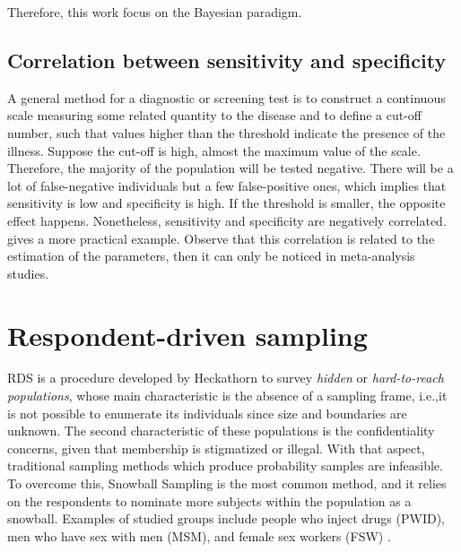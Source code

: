 Therefore, this work focus on the Bayesian paradigm. 

\subsection{Correlation between sensitivity and specificity}
\label{sec:correlation-sensitivity-specificity}

A general method for a diagnostic or screening test is to construct a
continuous scale measuring some related quantity to the disease and to define
a cut-off number, such that values higher than the threshold indicate the
presence of the illness. Suppose the cut-off is high, almost the maximum value
of the scale. Therefore, the majority of the population will be tested
negative. There will be a lot of false-negative individuals but a few
false-positive ones, which implies that sensitivity is low and specificity is
high. If the threshold is smaller, the opposite effect happens. Nonetheless,
sensitivity and specificity are negatively correlated. \textcite[p.
46]{parikh2008understanding} gives a more practical example. Observe that this
correlation is related to the estimation of the parameters, then it can only
be noticed in meta-analysis studies. 

\section{Respondent-driven sampling}
\label{sec:respodent_driven_sampling}

RDS is a procedure developed by Heckathorn
\cite[]{heckathorn1997} to survey {\em hidden} or {\em hard-to-reach
populations}, whose main characteristic is the absence of a sampling frame,
i.e.,it is not possible to enumerate its individuals since size and boundaries
are unknown. The second characteristic of these populations is the
confidentiality concerns, given that membership is stigmatized or illegal.
With that aspect, traditional sampling methods which produce probability
samples are infeasible. To overcome this, Snowball Sampling \cite[]{goodman1961}
is the most common method, and it relies on the respondents to nominate more 
subjects within the population as a snowball. Examples of studied groups
include people who inject drugs (PWID), men who have sex with men (MSM), and
female sex workers (FSW) \cite[p. 66]{gile2018methods}. 

